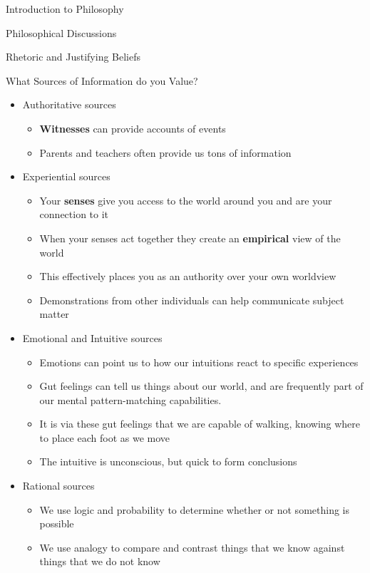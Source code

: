 \begin{chapter}{Introduction to Philosophy}
\begin{section}{Philosophical Discussions}
\begin{subsection}{Rhetoric and Justifying Beliefs}
\begin{subsubsection}{What Sources of Information do you Value?}
\begin{itemize}
                    \item Authoritative sources
                    \begin{itemize}
                        \item \textbf{Witnesses} can provide accounts of events
                        \item Parents and teachers often provide us tons of information
                    \end{itemize}
                    \item Experiential sources
                    \begin{itemize}
                        \item Your \textbf{senses} give you access to the world around you and are your connection to it
                        \item When your senses act together they create an \textbf{empirical} view of the world
                        \item This effectively places you as an authority over your own worldview
                        \item Demonstrations from other individuals can help communicate subject matter
                    \end{itemize}
                    \item Emotional and Intuitive sources
                    \begin{itemize}
                        \item Emotions can point us to how our intuitions react to specific experiences
                        \item Gut feelings can tell us things about our world, and are frequently part of our mental pattern-matching capabilities.
                        \item It is via these gut feelings that we are capable of walking, knowing where to place each foot as we move
                        \item The intuitive is unconscious, but quick to form conclusions
                    \end{itemize}
                    \item Rational sources
                    \begin{itemize}
                        \item We use logic and probability to determine whether or not something is possible
                        \item We use analogy to compare and contrast things that we know against things that we do not know
                    \end{itemize}
                \end{itemize}
                    

\end{subsubsection}
\end{subsection}
\end{section}
\end{chapter}
